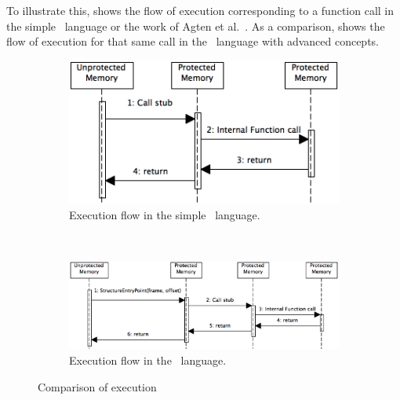 To illustrate this,  shows the flow of execution corresponding to a function call in the simple \MiniML\ language or the work of Agten et al.~\cite{Agten:2012:SCM:2354412.2355247}. As a comparison,  shows the flow of execution for that same call in the \MiniML\ language with advanced concepts.

\begin{figure}[htb]
\centering
\begin{subfigure}{\textwidth}
\centering
\includegraphics[scale=0.6]{img/Simple.png}
\caption{Execution flow in the simple \MiniML\ language. \label{fig:callstackcomparisonsimple}}
\end{subfigure}
\\
\begin{subfigure}{\textwidth}
\includegraphics[scale=0.6]{img/Advanced.png}
\caption{Execution flow in the \MiniML\ language. \label{fig:callstackcomparisonadvanced}}
\end{subfigure}
\caption{Comparison of execution}
\end{figure}


